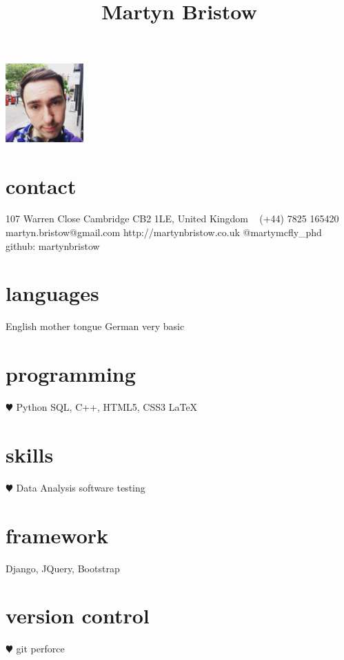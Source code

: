 \documentclass[]{cv-style}          %
\begin{document}
\lastupdated
\title{Martyn Bristow}


\begin{aside}
%
\includegraphics[width=3cm]{martyn.jpg}
\section{contact}
107 Warren Close
\hspace*{25pt} Cambridge
\hspace*{25pt} CB2 1LE, 
\hspace*{25pt} United Kingdom
~
(+44) 7825 165420
~
martyn.bristow@gmail.com
http://martynbristow.co.uk
@martymcfly_phd
github: martynbristow
\section{languages}
English mother tongue
German very basic
%
\section{programming}
{\color{red} $\varheartsuit$} Python
SQL, C++,
HTML5, CSS3
\LaTeX{}
\section{skills}
{\color{red} $\varheartsuit$} Data Analysis
software testing
\section{framework}
Django, JQuery, Bootstrap
\section{version control}
{\color{red} $\varheartsuit$} git
perforce
%
\end{aside}
\faLinkedinSign
\end{document}
